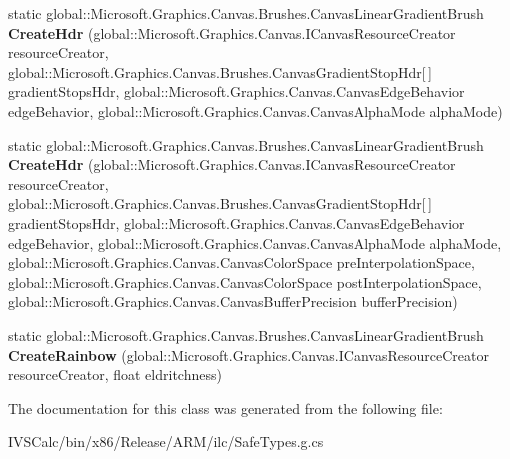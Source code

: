 \begin{DoxyCompactItemize}
\item 
\mbox{\label{class_microsoft_1_1_graphics_1_1_canvas_1_1_brushes_1_1_canvas_linear_gradient_brush_a1a0104bd1c67e8ce9f314d0238d4aca4}} 
static global\+::\+Microsoft.\+Graphics.\+Canvas.\+Brushes.\+Canvas\+Linear\+Gradient\+Brush {\bfseries Create\+Hdr} (global\+::\+Microsoft.\+Graphics.\+Canvas.\+I\+Canvas\+Resource\+Creator resource\+Creator, global\+::\+Microsoft.\+Graphics.\+Canvas.\+Brushes.\+Canvas\+Gradient\+Stop\+Hdr\mbox{[}$\,$\mbox{]} gradient\+Stops\+Hdr, global\+::\+Microsoft.\+Graphics.\+Canvas.\+Canvas\+Edge\+Behavior edge\+Behavior, global\+::\+Microsoft.\+Graphics.\+Canvas.\+Canvas\+Alpha\+Mode alpha\+Mode)
\item 
\mbox{\label{class_microsoft_1_1_graphics_1_1_canvas_1_1_brushes_1_1_canvas_linear_gradient_brush_a0c6d262a63d8d21f04c1bb8c01fb6ac4}} 
static global\+::\+Microsoft.\+Graphics.\+Canvas.\+Brushes.\+Canvas\+Linear\+Gradient\+Brush {\bfseries Create\+Hdr} (global\+::\+Microsoft.\+Graphics.\+Canvas.\+I\+Canvas\+Resource\+Creator resource\+Creator, global\+::\+Microsoft.\+Graphics.\+Canvas.\+Brushes.\+Canvas\+Gradient\+Stop\+Hdr\mbox{[}$\,$\mbox{]} gradient\+Stops\+Hdr, global\+::\+Microsoft.\+Graphics.\+Canvas.\+Canvas\+Edge\+Behavior edge\+Behavior, global\+::\+Microsoft.\+Graphics.\+Canvas.\+Canvas\+Alpha\+Mode alpha\+Mode, global\+::\+Microsoft.\+Graphics.\+Canvas.\+Canvas\+Color\+Space pre\+Interpolation\+Space, global\+::\+Microsoft.\+Graphics.\+Canvas.\+Canvas\+Color\+Space post\+Interpolation\+Space, global\+::\+Microsoft.\+Graphics.\+Canvas.\+Canvas\+Buffer\+Precision buffer\+Precision)
\item 
\mbox{\label{class_microsoft_1_1_graphics_1_1_canvas_1_1_brushes_1_1_canvas_linear_gradient_brush_a521b2a32aa6e7539839397dae253b7a8}} 
static global\+::\+Microsoft.\+Graphics.\+Canvas.\+Brushes.\+Canvas\+Linear\+Gradient\+Brush {\bfseries Create\+Rainbow} (global\+::\+Microsoft.\+Graphics.\+Canvas.\+I\+Canvas\+Resource\+Creator resource\+Creator, float eldritchness)
\end{DoxyCompactItemize}


The documentation for this class was generated from the following file\+:\begin{DoxyCompactItemize}
\item 
I\+V\+S\+Calc/bin/x86/\+Release/\+A\+R\+M/ilc/Safe\+Types.\+g.\+cs\end{DoxyCompactItemize}
